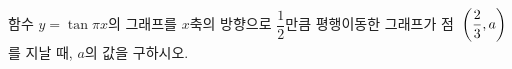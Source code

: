함수 $y=\tan\pi x$의 그래프를 $x$축의 방향으로 $\dfrac{1}{2}$만큼 평행이동한 그래프가 점~$\left(\dfrac{2}{3}{,}\mkern3mu\mathopen{}a\right)$를 지날 때, $a$의 값을 구하시오.
